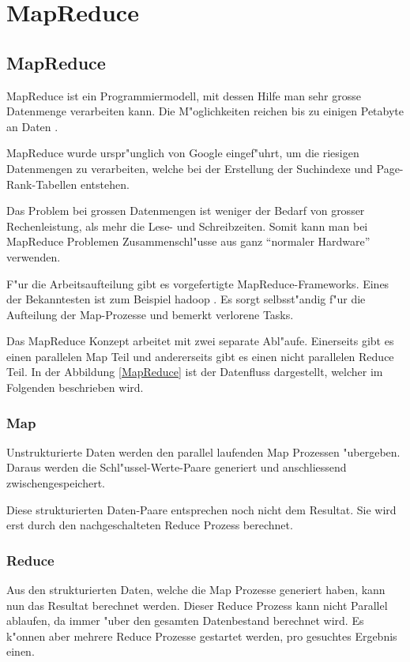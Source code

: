 \chapter{MapReduce}
\begin{refsection}

\section{MapReduce}
MapReduce ist ein Programmiermodell, mit dessen Hilfe man sehr grosse
Datenmenge verarbeiten kann.  Die M"oglichkeiten reichen bis zu
einigen Petabyte an Daten \cite{wiki:mapReduce}.

MapReduce wurde urspr"unglich von Google eingef"uhrt, um die riesigen
Datenmengen zu verarbeiten, welche bei der Erstellung der Suchindexe
und Page-Rank-Tabellen entstehen.

Das Problem bei grossen Datenmengen ist weniger der Bedarf von grosser
Rechenleistung, als mehr die Lese- und Schreibzeiten.  Somit kann man
bei MapReduce Problemen Zusammenschl"usse aus ganz \enquote{normaler
  Hardware} verwenden.

F"ur die Arbeitsaufteilung gibt es vorgefertigte
MapReduce-Frameworks.  Eines der Bekanntesten ist zum Beispiel hadoop
\cite{apache:hadoop}.  Es sorgt selbsst"andig f"ur die Aufteilung der
Map-Prozesse und bemerkt verlorene Tasks.

Das MapReduce Konzept arbeitet mit zwei separate Abl"aufe.
Einerseits gibt es einen parallelen Map Teil und andererseits gibt es
einen nicht parallelen Reduce Teil.  In der Abbildung \ref{MapReduce}
ist der Datenfluss dargestellt, welcher im Folgenden beschrieben wird.

\subsection{Map}
Unstrukturierte Daten werden den parallel laufenden Map Prozessen
"ubergeben.  Daraus werden die Schl"ussel-Werte-Paare generiert und anschliessend zwischengespeichert.

Diese strukturierten Daten-Paare entsprechen noch nicht dem
Resultat. Sie wird erst durch den nachgeschalteten Reduce Prozess
berechnet.

\subsection{Reduce}
Aus den strukturierten Daten, welche die Map Prozesse generiert haben,
kann nun das Resultat berechnet werden.  Dieser Reduce Prozess kann
nicht Parallel ablaufen, da immer "uber den gesamten Datenbestand
berechnet wird.  Es k"onnen aber mehrere Reduce Prozesse gestartet
werden, pro gesuchtes Ergebnis einen.


\end{refsection}
